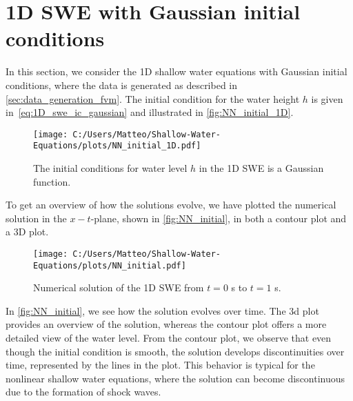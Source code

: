 \section{1D SWE with Gaussian initial conditions}
In this section, we consider the 1D shallow water equations with Gaussian initial conditions, where the data is generated as described in \autoref{sec:data_generation_fvm}.
The initial condition for the water height $h$ is given in~\eqref{eq:1D_swe_ic_gaussian} and illustrated in \autoref{fig:NN_initial_1D}.
\begin{figure}[H]
    \centering
    \texttt{[image: C:/Users/Matteo/Shallow-Water-Equations/plots/NN\_initial\_1D.pdf]}
    \caption{The initial conditions for water level $h$ in the 1D SWE is a Gaussian function.}\label{fig:NN_initial_1D}
\end{figure}
To get an overview of how the solutions evolve, we have plotted the numerical solution in the $x-t$-plane, shown in \autoref{fig:NN_initial}, in both a contour plot and a 3D plot.
\begin{figure}[H]
    \hspace{3cm} %
    \texttt{[image: C:/Users/Matteo/Shallow-Water-Equations/plots/NN\_initial.pdf]}
    \caption{Numerical solution of the 1D SWE from $t = 0$ s to $t = 1$ s.}\label{fig:NN_initial}
\end{figure}
In \autoref{fig:NN_initial}, we see how the solution evolves over time.
The 3d plot provides an overview of the solution, whereas the contour plot offers a more detailed view of the water level.
From the contour plot, we observe that even though the initial condition is smooth, the solution develops discontinuities over time, represented by the lines in the plot.
This behavior is typical for the nonlinear shallow water equations, where the solution can become discontinuous due to the formation of shock waves.

